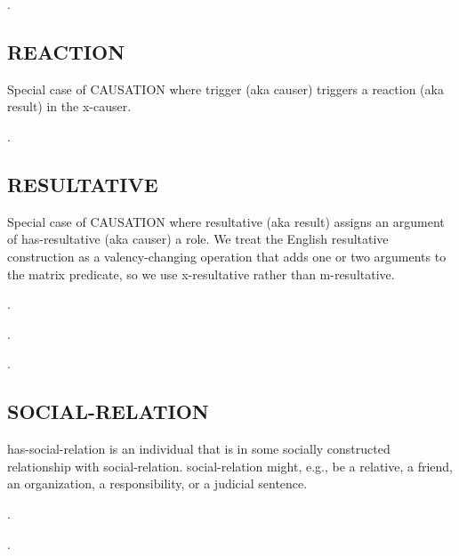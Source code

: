 \documentclass[a4paper]{article}
\newcommand{\fr}[1]{\textsf{#1}}
\newcommand{\rl}[1]{\textsf{#1}}
\begin{document}
\ex.


\newpage\subsection{ \fr{REACTION}}
\label{sec:REACTION}

Special case of \fr{CAUSATION} where \rl{trigger} (aka \rl{causer}) triggers a
\rl{reaction} (aka \rl{result}) in the \rl{x-causer}.

\ex.


\newpage\subsection{ \fr{RESULTATIVE}}
\label{sec:RESULTATIVE}

Special case of \fr{CAUSATION} where \rl{resultative} (aka \rl{result}) assigns
an argument of \rl{has-resultative} (aka \rl{causer}) a role. We treat the
English resultative construction as a valency-changing operation that adds one
or two arguments to the matrix predicate, so we use \rl{x-resultative} rather
than \rl{m-resultative}.

\ex.

\ex.

\ex.


\newpage\subsection{ \fr{SOCIAL-RELATION}}
\label{sec:SOCIAL-RELATION}

\rl{has-social-relation} is an individual that is in some socially constructed
relationship with \rl{social-relation}. \rl{social-relation} might, e.g., be a
relative, a friend, an organization, a responsibility, or a judicial sentence.

\ex.

\ex.
\end{document}
